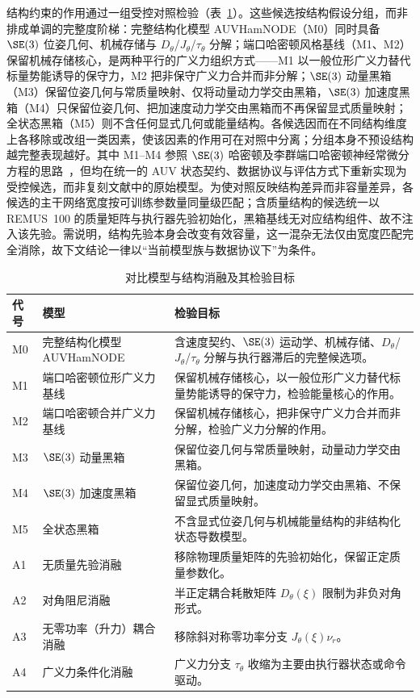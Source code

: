 结构约束的作用通过一组受控对照检验（表~\ref{tab:model-comparison-roles}）。这些候选按结构假设分组，而非排成单调的完整度阶梯：完整结构化模型 AUVHamNODE（M0）同时具备 \(\SE(3)\) 位姿几何、机械存储与 \(D_\theta\)/\(J_\theta\)/\(\tau_\theta\) 分解；端口哈密顿风格基线（M1、M2）保留机械存储核心，是两种平行的广义力组织方式——M1 以一般位形广义力替代标量势能诱导的保守力，M2 把非保守广义力合并而非分解；\(\SE(3)\) 动量黑箱（M3）保留位姿几何与常质量映射、仅将动量动力学交由黑箱，\(\SE(3)\) 加速度黑箱（M4）只保留位姿几何、把加速度动力学交由黑箱而不再保留显式质量映射；全状态黑箱（M5）则不含任何显式几何或能量结构。各候选因而在不同结构维度上各移除或改组一类因素，使该因素的作用可在对照中分离；分组本身不预设结构越完整表现越好。其中 M1--M4 参照 \(\SE(3)\) 哈密顿及李群端口哈密顿神经常微分方程的思路~\citep{duong2021se3hamnode,duong2024liegroupphnode}，但均在统一的 AUV 状态契约、数据协议与评估方式下重新实现为受控候选，而非复刻文献中的原始模型。为使对照反映结构差异而非容量差异，各候选的主干网络宽度按可训练参数量同量级匹配；含质量结构的候选统一以 REMUS~100 的质量矩阵与执行器先验初始化，黑箱基线无对应结构组件、故不注入该先验。需说明，结构先验本身会改变有效容量，这一混杂无法仅由宽度匹配完全消除，故下文结论一律以“当前模型族与数据协议下”为条件。

\begin{table}[htbp]
  \centering
  \caption{对比模型与结构消融及其检验目标}
  \label{tab:model-comparison-roles}
  \begin{tabularx}{\textwidth}{l>{\raggedright\arraybackslash}p{}>{\raggedright\arraybackslash}X}
    \toprule
    代号 & 模型 & 检验目标 \\
    \midrule
    M0 & 完整结构化模型 AUVHamNODE & 含速度契约、\(\SE(3)\) 运动学、机械存储、\(D_\theta\)/\(J_\theta\)/\(\tau_\theta\) 分解与执行器滞后的完整候选项。 \\
    M1 & 端口哈密顿位形广义力基线 & 保留机械存储核心，以一般位形广义力替代标量势能诱导的保守力，检验能量核心的作用。 \\
    M2 & 端口哈密顿合并广义力基线 & 保留机械存储核心，把非保守广义力合并而非分解，检验广义力分解的作用。 \\
    M3 & \(\SE(3)\) 动量黑箱 & 保留位姿几何与常质量映射，动量动力学交由黑箱。 \\
    M4 & \(\SE(3)\) 加速度黑箱 & 保留位姿几何，加速度动力学交由黑箱、不保留显式质量映射。 \\
    M5 & 全状态黑箱 & 不含显式位姿几何与机械能量结构的非结构化状态导数模型。 \\
    \midrule
    A1 & 无质量先验消融 & 移除物理质量矩阵的先验初始化，保留正定质量参数化。 \\
    A2 & 对角阻尼消融 & 半正定耦合耗散矩阵 \(D_\theta(\xi)\) 限制为非负对角形式。 \\
    A3 & 无零功率（升力）耦合消融 & 移除斜对称零功率分支 \(J_\theta(\xi)\nu_r\)。 \\
    A4 & 广义力条件化消融 & 广义力分支 \(\tau_\theta\) 收缩为主要由执行器状态或命令驱动。 \\
    \bottomrule
  \end{tabularx}
\end{table}

